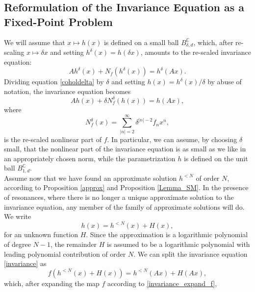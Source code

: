 \documentclass{amsart}
\theoremstyle{plain}
\theoremstyle{definition}
\begin{document}
\subsection{Reformulation of the Invariance Equation as a Fixed-Point Problem}

We will assume that $x\mapsto h(x)$ is defined on a small ball $B_{\delta,d}^\mathbb{C}$, which, after re-scaling $x\mapsto \delta x$ and setting $h^\delta(x)=h(\delta x)$, amounts to the re-scaled invariance equation:
\begin{equation}\label{coholdelta}
Ah^\delta(x)+N_f(h^\delta(x))=h^\delta(Ax).
\end{equation}
Dividing equation \eqref{coholdelta} by $\delta$ and setting $h(x)=h^\delta(x)/\delta$ by abuse of notation, the invariance equation becomes
\begin{equation}\label{invariance_expand_f}
Ah(x)+\delta N_f^\delta (h(x))=h(Ax),
\end{equation}
where
\begin{equation}\label{N_f_expand}
N_f^\delta(x)=\sum_{|n|=2}^\infty \delta^{|n|-2} f_nx^n,
\end{equation}
is the re-scaled nonlinear part of $f$. In particular, we can assume, by choosing $\delta$ small, that the nonlinear part of the invariance equation is as small as we like in an appropriately chosen norm, while the parametrization $h$ is defined on the unit ball $B_{1,d}^\mathbb{C}$.\\
Assume now that we have found an approximate solution $h^{< N}$ of order $N$, according to Proposition \ref{approx} and Proposition \ref{Lemma_SM}. In the presence of resonances, where there is no longer a unique approximate solution to the invariance equation, any member of the family of approximate solutions will do. We write
\begin{equation}
h(x)=h^{< N}(x)+H(x),
\end{equation}
for an unknown function $H$. Since the approximation is a logarithmic polynomial of degree $N-1$, the remainder $H$ is assumed to be a logarithmic polynomial with leading polynomial contribution of order $N$.
We can split the invariance equation \eqref{invariance} as
\begin{equation}
f(h^{< N}(x)+H(x))=h^{< N}(Ax)+H(Ax),
\end{equation}
which, after expanding the map $f$ according to \eqref{invariance_expand_f},
\end{document}
